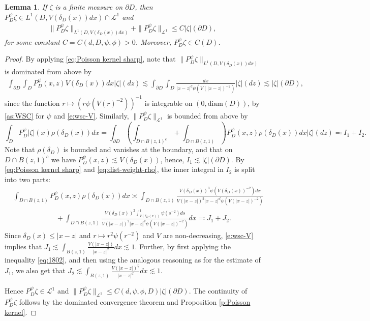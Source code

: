 \documentclass[12pt,a4paper,onecolumn]{article}
\newtheorem{lem}[thm]{Lemma}
\theoremstyle{definition}
\newcommand{\1}{\mathbf 1}
\newcommand{\de}{\delta_D}
\newcommand{\LLL}{L^1(D,V(\de(x))dx)}
\newcommand{\calL}{\mathcal{L}^1}
\newcommand{\PDS}{P^{\psi}_{ D}}
\numberwithin{equation}{section}
\begin{document}
	\begin{lem}\label{l:integrability of Poisson potentials}
		If $\zeta$ is a finite measure on $\partial D$, then $\PDS\zeta \in \LLL \cap \calL$ and 
		\begin{align*}
			\|\PDS\zeta\|_{\LLL}+\|\PDS\zeta\|_{\calL}\le C |\zeta|(\partial D),
		\end{align*}
		for some constant $C=C(d,D,\psi,\phi)>0$.  Moreover, $\PDS\zeta \in C(D)$.
	\end{lem}
	\begin{proof}
        By applying \eqref{eq:Poisson kernel sharp}, note that $\|\PDS\zeta\|_{\LLL}$ is dominated from above by 
        \begin{align*}
            \int_{\partial D}\int_D \PDS(x,z)V(\de(x))dx|\zeta|(dz)
        	 \lesssim\int_{\partial D}\int_{D} \frac{dx}{|x-z|^d\psi(V(|x-z|)^{-2})}|\zeta|(dz)\lesssim |\zeta|(\partial D),
        \end{align*}
        since the function $r\mapsto (r\psi(V(r)^{-2}))^{-1}$ is integrable on $(0,\text{diam}(D))$, by \ref{as:WSC} for $\psi$ and \eqref{e:wsc-V}.
        Similarly, $\|\PDS\zeta\|_{\calL}$ is bounded from above by
        $$\int_D \PDS|\zeta|(x)\rho(\de(x))dx=\int_{\partial D}\left(\int_{D\cap B(z,1)^c}+\int_{D\cap B(z,1)}\right)\PDS(x,z)\rho(\de(x))dx|\zeta|(dz)\eqqcolon I_1 + I_2.
        $$
        Note that $\rho(\de)$ is bounded and vanishes at the boundary, and that on $D\cap B(z,1)^c$ we have $\PDS(x,z)\lesssim V(\de(x))$, hence, $I_1\lesssim |\zeta|(\partial D)$.  By \eqref{eq:Poisson kernel sharp} and \eqref{eq:dist-weight-rho}, the inner integral in $I_2$ is split into two parts:
        \begin{align*}
            &\int_{D\cap B(z,1)}\PDS(x,z)\rho(\de(x))dx\asymp
            \int_{D\cap B(z,1)}\frac{V(\de(x))^3 \psi(V(\de(x))^{-2})dx}{V(|x-z|)^2|x-z|^d\psi(V(|x-z|)^{-2})}\\
            &\hspace{6em}+\int_{D\cap B(z,1)}\frac{V(\de(x))^2\int_{V(\de(x))}^1 \psi(s^{-2})ds}{V(|x-z|)^2|x-z|^d\psi(V(|x-z|)^{-2})}dx\eqqcolon J_1+J_2.
        \end{align*}
        Since $\de(x)\le |x-z|$ and $r\mapsto r^2\psi(r^{-2})$ and $V$ are non-decreasing, \eqref{e:wsc-V} implies that
        $J_1\lesssim \int_{B(z,1)}\frac{V(|x-z|)}{|x-z|^d}dx\lesssim 1.$
        Further, by first applying the inequality \eqref{eq:1802}, and then using the analogous reasoning as for the estimate of $J_1$, we also get that
        $J_2\lesssim \int_{B(z,1)}\frac{V(|x-z|)^{\eta}}{|x-z|^d}dx\lesssim 1.$
        
        Hence $\PDS\zeta\in \calL$  and $\|\PDS\zeta\|_{\calL}\le C(d,\psi,\phi,D) |\zeta|(\partial D)$. The continuity of $\PDS\zeta$ follows by the dominated convergence theorem and Proposition \ref{p:Poisson kernel}.
        \end{proof}
	
\end{document}
